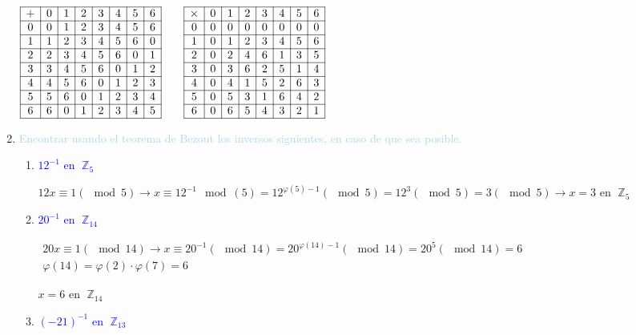 \documentclass[12pt]{article}
\newcommand{\lb}[1]{\textcolor{lightblue}{#1}}
\newcommand{\db}[1]{\textcolor{blue}{#1}}
\DeclareMathOperator{\Z}{\mathbb{Z}}
\begin{document}
\begin{enumerate}[label=\color{red}\textbf{\arabic*)}, leftmargin=*]
	$\begin{array}{|c|c|c|c|c|c|c|c|}
		\hline
		+ & 0 & 1 & 2 & 3 & 4 & 5 & 6 \\ \hline
		0 & 0 & 1 & 2 & 3 & 4 & 5 & 6 \\ \hline
		1 & 1 & 2 & 3 & 4 & 5 & 6 & 0 \\ \hline
		2 & 2 & 3 & 4 & 5 & 6 & 0 & 1 \\ \hline
		3 & 3 & 4 & 5 & 6 & 0 & 1 & 2 \\ \hline
		4 & 4 & 5 & 6 & 0 & 1 & 2 & 3 \\ \hline
		5 & 5 & 6 & 0 & 1 & 2 & 3 & 4 \\ \hline
		6 & 6 & 0 & 1 & 2 & 3 & 4 & 5 \\ \hline
	\end{array}\qquad\begin{array}{|c|c|c|c|c|c|c|c|}
	\hline
	\times & 0 & 1 & 2 & 3 & 4 & 5 & 6 \\ \hline
	0 & 0 & 0 & 0 & 0 & 0 & 0 & 0 \\ \hline
	1 & 0 & 1 & 2 & 3 & 4 & 5 & 6 \\ \hline
	2 & 0 & 2 & 4 & 6 & 1 & 3 & 5 \\ \hline
	3 & 0 & 3 & 6 & 2 & 5 & 1 & 4 \\ \hline
	4 & 0 & 4 & 1 & 5 & 2 & 6 & 3 \\ \hline
	5 & 0 & 5 & 3 & 1 & 6 & 4 & 2 \\ \hline
	6 & 0 & 6 & 5 & 4 & 3 & 2 & 1\\ \hline
	\end{array}$
	\item \lb{Encontrar usando el teorema de Bezout los inversos siguientes, en caso de que sea posible.}
	\begin{enumerate}[label=\color{red}\alph*)]
		\item \db{$12^{-1}$ en $\Z_5$}
		
		$12x\equiv1(\mod5)\longrightarrow x\equiv12^{-1}\mod(5)=12^{\varphi(5)-1}(\mod 5)=12^{3}(\mod5)=3(\mod5)\longrightarrow x=3$ en $\Z_5$
		\item \db{$20^{-1}$ en $\Z_{14}$}
		
		$\begin{array}{l}
			20x\equiv1(\mod14)\longrightarrow x\equiv20^{-1}(\mod14)=20^{\varphi(14)-1}(\mod14)=20^5(\mod14)=6\\
			\varphi(14)=\varphi(2)\cdot\varphi(7)=6
		\end{array}$
		
		$x=6$ en $\Z_{14}$
		\item \db{$(-21)^{-1}$ en $\Z_{13}$}
		

\end{enumerate}
\end{enumerate}
\end{document}
